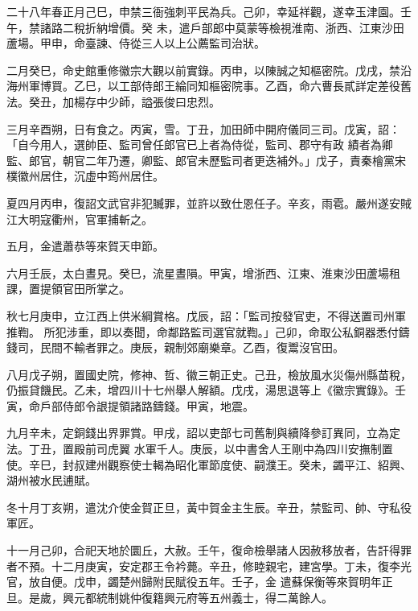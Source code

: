 \begin{pinyinscope}
 二十八年春正月己巳，申禁三衙強刺平民為兵。己卯，幸延祥觀，遂幸玉津園。壬午，禁諸路二稅折納增價。癸
 未，遣戶部郎中莫蒙等檢視淮南、浙西、江東沙田蘆場。甲申，命臺諫、侍從三人以上公薦監司治狀。



 二月癸巳，命史館重修徽宗大觀以前實錄。丙申，以陳誠之知樞密院。戊戌，禁沿海州軍博買。乙巳，以工部侍郎王綸同知樞密院事。乙酉，命六曹長貳詳定差役舊法。癸丑，加楊存中少師，謚張俊曰忠烈。



 三月辛酉朔，日有食之。丙寅，雪。丁丑，加田師中開府儀同三司。戊寅，詔：「自今用人，選帥臣、監司曾任郎官已上者為侍從，監司、郡守有政
 績者為卿監、郎官，朝官二年乃遷，卿監、郎官未歷監司者更迭補外。」戊子，責秦檜黨宋樸徽州居住，沉虛中筠州居住。



 夏四月丙申，復詔文武官非犯贓罪，並許以致仕恩任子。辛亥，雨雹。嚴州遂安賊江大明寇衢州，官軍捕斬之。



 五月，金遣蕭恭等來賀天申節。



 六月壬辰，太白晝見。癸巳，流星晝隕。甲寅，增浙西、江東、淮東沙田蘆場租課，置提領官田所掌之。



 秋七月庚申，立江西上供米綱賞格。戊辰，詔：「監司按發官吏，不得送置司州軍推鞫。
 所犯涉重，即以奏聞，命鄰路監司選官就鞫。」己卯，命取公私銅器悉付鑄錢司，民間不輸者罪之。庚辰，親制郊廟樂章。乙酉，復鬻沒官田。



 八月戊子朔，置國史院，修神、哲、徽三朝正史。己丑，檢放風水災傷州縣苗稅，仍振貸饑民。乙未，增四川十七州舉人解額。戊戌，湯思退等上《徽宗實錄》。壬寅，命戶部侍郎令詪提領諸路鑄錢。甲寅，地震。



 九月辛未，定銅錢出界罪賞。甲戌，詔以吏部七司舊制與續降參訂異同，立為定法。丁丑，置殿前司虎翼
 水軍千人。庚辰，以中書舍人王剛中為四川安撫制置使。辛巳，封叔建州觀察使士輵為昭化軍節度使、嗣濮王。癸未，蠲平江、紹興、湖州被水民逋賦。



 冬十月丁亥朔，遣沈介使金賀正旦，黃中賀金主生辰。辛丑，禁監司、帥、守私役軍匠。



 十一月己卯，合祀天地於圜丘，大赦。壬午，復命檢舉諸人因赦移放者，告訐得罪者不預。十二月庚寅，安定郡王令衿薨。辛丑，修睦親宅，建宮學。丁未，復李光官，放自便。戊申，蠲楚州歸附民賦役五年。壬子，金
 遣蘇保衡等來賀明年正旦。是歲，興元都統制姚仲復籍興元府等五州義士，得二萬餘人。




\end{pinyinscope}
